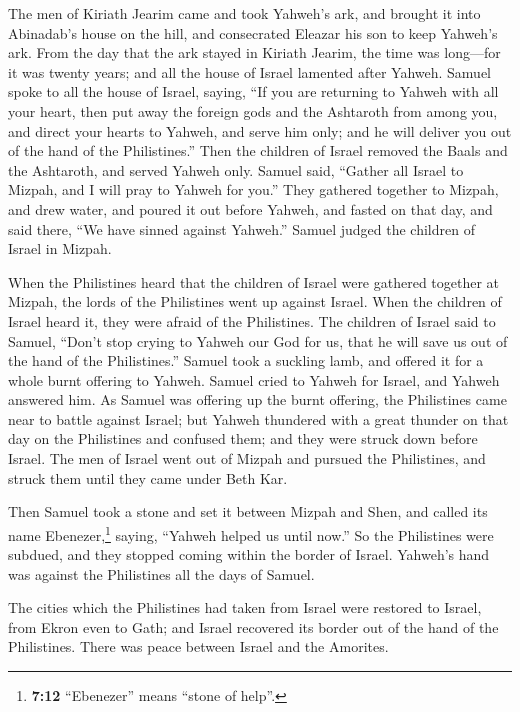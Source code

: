  The men of Kiriath Jearim came and took Yahweh's ark, and
brought it into Abinadab's house on the hill, and consecrated Eleazar
his son to keep Yahweh's ark.  From the day that the ark
stayed in Kiriath Jearim, the time was long---for it was twenty years;
and all the house of Israel lamented after Yahweh.  Samuel
spoke to all the house of Israel, saying, ``If you are returning to
Yahweh with all your heart, then put away the foreign gods and the
Ashtaroth from among you, and direct your hearts to Yahweh, and serve
him only; and he will deliver you out of the hand of the Philistines.''
 Then the children of Israel removed the Baals and the
Ashtaroth, and served Yahweh only.  Samuel said, ``Gather
all Israel to Mizpah, and I will pray to Yahweh for you.''
 They gathered together to Mizpah, and drew water, and
poured it out before Yahweh, and fasted on that day, and said there,
``We have sinned against Yahweh.'' Samuel judged the children of Israel
in Mizpah.

 When the Philistines heard that the children of Israel
were gathered together at Mizpah, the lords of the Philistines went up
against Israel. When the children of Israel heard it, they were afraid
of the Philistines.  The children of Israel said to
Samuel, ``Don't stop crying to Yahweh our God for us, that he will save
us out of the hand of the Philistines.''  Samuel took a
suckling lamb, and offered it for a whole burnt offering to Yahweh.
Samuel cried to Yahweh for Israel, and Yahweh answered him.
 As Samuel was offering up the burnt offering, the
Philistines came near to battle against Israel; but Yahweh thundered
with a great thunder on that day on the Philistines and confused them;
and they were struck down before Israel.  The men of
Israel went out of Mizpah and pursued the Philistines, and struck them
until they came under Beth Kar.

 Then Samuel took a stone and set it between Mizpah and
Shen, and called its name Ebenezer,\footnote{\textbf{7:12} ``Ebenezer''
  means ``stone of help''.} saying, ``Yahweh helped us until now.''
 So the Philistines were subdued, and they stopped coming
within the border of Israel. Yahweh's hand was against the Philistines
all the days of Samuel.

 The cities which the Philistines had taken from Israel
were restored to Israel, from Ekron even to Gath; and Israel recovered
its border out of the hand of the Philistines. There was peace between
Israel and the Amorites.


